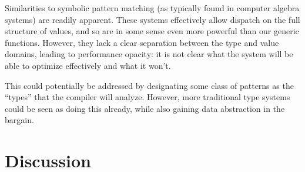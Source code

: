 \documentclass[preprint]{sigplanconf}
\newcommand{\code}[1]{\texttt{#1}}
\begin{document}
Similarities to symbolic pattern matching (as typically found in
computer algebra systems) are readily apparent. These systems effectively
allow dispatch on the full structure of values, and so are in some sense
even more powerful than our generic functions. However, they lack a clear
separation between the type and value domains, leading to performance
opacity: it is not clear what the system will be able to optimize
effectively and what it won't.

This could potentially be addressed by
designating some class of patterns as the ``types'' that the compiler
will analyze. However, more traditional type systems could be seen as
doing this already, while also gaining data abstraction in the bargain.







\section{Discussion}
\end{document}
